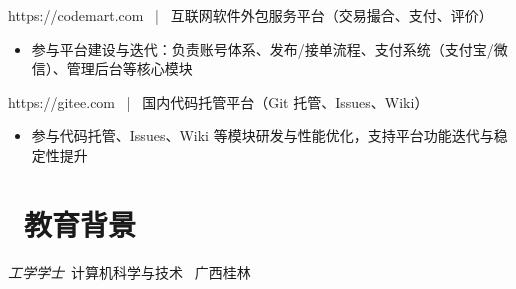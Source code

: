\documentclass{resume}
\begin{document}
https://codemart.com \ | \ 互联网软件外包服务平台（交易撮合、支付、评价）
\begin{onehalfspacing}
\begin{itemize}
  \item 参与平台建设与迭代：负责账号体系、发布/接单流程、支付系统（支付宝/微信）、管理后台等核心模块
\end{itemize}
\end{onehalfspacing}

https://gitee.com \ | \ 国内代码托管平台（Git 托管、Issues、Wiki）
\begin{onehalfspacing}
\begin{itemize}
  \item 参与代码托管、Issues、Wiki 等模块研发与性能优化，支持平台功能迭代与稳定性提升
\end{itemize}
\end{onehalfspacing}

\section{\faGraduationCap\ 教育背景}
\textit{工学学士}\ 计算机科学与技术 \textperiodcentered\ 广西桂林
\end{document}
